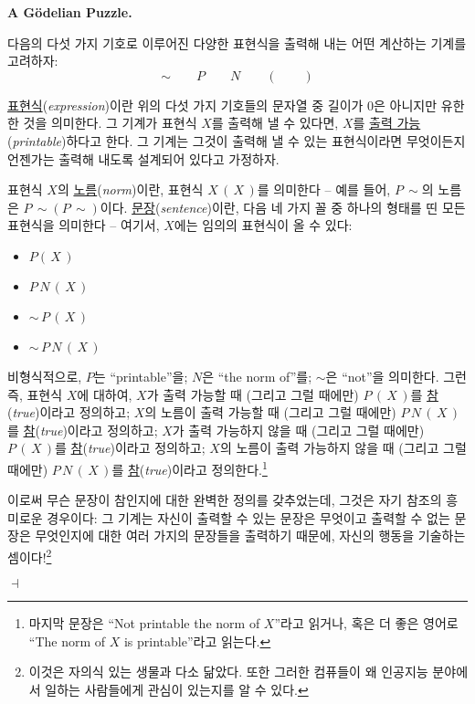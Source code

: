 \documentclass[12pt]{paper}
\newenvironment{context}[1][]
{ \noindent \textbf{{#1}.}
}
{ \hfill $ \dashv $
}
\begin{document}
  \begin{context}[A G\"odelian Puzzle]
    다음의 다섯 가지 기호로 이루어진 다양한 표현식을 출력해 내는 어떤 계산하는 기계를 고려하자:
    $$ \sim \qquad P \qquad N \qquad \left( \right. \qquad \left. \right) $$
    
    \underline{표현식}(\textit{expression})이란 위의 다섯 가지 기호들의 문자열 중 길이가 $0$은 아니지만 유한한 것을 의미한다.
    그 기계가 표현식 $X$를 출력해 낼 수 있다면,
    $X$를 \underline{출력 가능}(\textit{printable})하다고 한다.
    그 기계는 그것이 출력해 낼 수 있는 표현식이라면 무엇이든지 언젠가는 출력해 내도록 설계되어 있다고 가정하자.

    표현식 $X$의 \underline{노름}(\textit{norm})이란,
    표현식 $X \, \left( \, X \, \right)$를 의미한다 --
    예를 들어, $P \, \sim$의 노름은 $P \, \sim \left( P \, \sim \right)$이다.
    \underline{문장}(\textit{sentence})이란, 다음 네 가지 꼴 중 하나의 형태를 띤 모든 표현식을 의미한다 --
    여기서, $X$에는 임의의 표현식이 올 수 있다:
    \begin{itemize}
      \item[(1)] $P \left( \, X \, \right)$
      \item[(2)] $P \, N \, \left( \, X \, \right)$
      \item[(3)] $\sim \, P \, \left( \, X \, \right)$
      \item[(4)] $\sim \, P \, N \, \left( \, X \, \right)$   
    \end{itemize}

    비형식적으로, $P$는 ``printable''을; $N$은 ``the norm of''를; $\sim$은 ``not''을 의미한다.
    그런즉, 표현식 $X$에 대하여,
    $X$가 출력 가능할 때 (그리고 그럴 때에만) $P \, \left( \, X \, \right)$를 \underline{참}(\textit{true})이라고 정의하고;
    $X$의 노름이 출력 가능할 때 (그리고 그럴 때에만) $P \, N \, \left( \, X \, \right)$를 \underline{참}(\textit{true})이라고 정의하고;
    $X$가 출력 가능하지 않을 때 (그리고 그럴 때에만) $P \, \left( \, X \, \right)$를 \underline{참}(\textit{true})이라고 정의하고;
    $X$의 노름이 출력 가능하지 않을 때 (그리고 그럴 때에만) $P \, N \, \left( \, X \, \right)$를 \underline{참}(\textit{true})이라고 정의한다.\footnote
    {
      마지막 문장은 ``Not printable the norm of $X$''라고 읽거나,
      혹은 더 좋은 영어로 ``The norm of $X$ is printable''라고 읽는다.
    }

    이로써 무슨 문장이 참인지에 대한 완벽한 정의를 갖추었는데,
    그것은 자기 참조의 흥미로운 경우이다:
    그 기계는 자신이 출력할 수 있는 문장은 무엇이고 출력할 수 없는 문장은 무엇인지에 대한 여러 가지의 문장들을 출력하기 때문에,
    자신의 행동을 기술하는 셈이다!\footnote
    {
      이것은 자의식 있는 생물과 다소 닮았다.
      또한 그러한 컴퓨들이 왜 인공지능 분야에서 일하는 사람들에게 관심이 있는지를 알 수 있다.
    }


\end{context}
\end{document}
